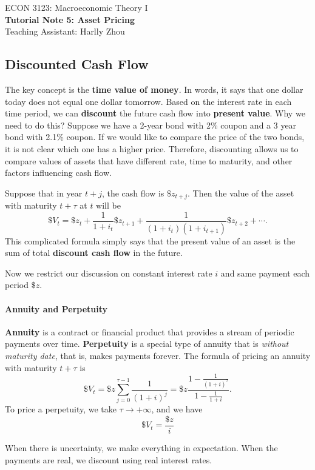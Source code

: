 \documentclass[12pt]{article}
\begin{document}
\begin{center}
    ECON 3123: Macroeconomic Theory I\\
    {\large \textbf{Tutorial Note 5: Asset Pricing}}\\
    Teaching Assistant: Harlly Zhou
\end{center}

\subsection*{Discounted Cash Flow}
The key concept is the \textbf{time value of money}. In words, it says that one dollar today does not equal one dollar tomorrow. Based on the interest rate in each time period, we can \textbf{discount} the future cash flow into \textbf{present value}. Why we need to do this? Suppose we have a 2-year bond with 2\% coupon and a 3 year bond with 2.1\% coupon. If we would like to compare the price of the two bonds, it is not clear which one has a higher price. Therefore, discounting allows us to compare values of assets that have different rate, time to maturity, and other factors influencing cash flow.

Suppose that in year $t+j$, the cash flow is $\$z_{t+j}$. Then the value of the asset with maturity $t+\tau$ at $t$ will be
\[\$V_t = \$ z_t + \frac{1}{1+i_t}\$ z_{t+1} + \frac{1}{(1+i_t)(1+i_{t+1})}\$ z_{t+2} + \cdots.\]
This complicated formula simply says that the present value of an asset is the sum of total \textbf{discount cash flow} in the future.

Now we restrict our discussion on constant interest rate $i$ and same payment each period $\$z$.

\paragraph{Annuity and Perpetuity} \textbf{Annuity} is a contract or financial product that provides a stream of periodic payments over time. \textbf{Perpetuity} is a special type of annuity that is \textit{without maturity date}, that is, makes payments forever. The formula of pricing an annuity with maturity $t+\tau$ is
\[\$ V_t = \$z \sum_{j=0}^{\tau-1} \frac{1}{(1+i)^j} = \$z \frac{1-\frac{1}{(1+i)^\tau}}{1-\frac{1}{1+i}}.\]
To price a perpetuity, we take $\tau \rightarrow +\infty$, and we have
\[\$ V_t = \frac{\$z}{i}\]

When there is uncertainty, we make everything in expectation. When the payments are real, we discount using real interest rates.
\end{document}
